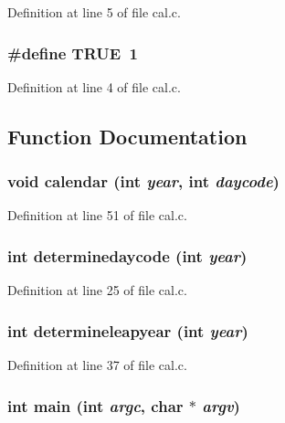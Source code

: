 Definition at line 5 of file cal.c.

\subsubsection[{TRUE}]{\setlength{\rightskip}{0pt plus 5cm}\#define TRUE~1}\label{cal_8c_aa8cecfc5c5c054d2875c03e77b7be15d}


Definition at line 4 of file cal.c.



\subsection{Function Documentation}
\subsubsection[{calendar}]{\setlength{\rightskip}{0pt plus 5cm}void calendar (int {\em year}, \/  int {\em daycode})}\label{cal_8c_a97ea32ae9f49a94f9a633020a924341c}


Definition at line 51 of file cal.c.

\subsubsection[{determinedaycode}]{\setlength{\rightskip}{0pt plus 5cm}int determinedaycode (int {\em year})}\label{cal_8c_a6b76896879d11c767b0cfca628c4591c}


Definition at line 25 of file cal.c.

\subsubsection[{determineleapyear}]{\setlength{\rightskip}{0pt plus 5cm}int determineleapyear (int {\em year})}\label{cal_8c_a576624b07ee30f4b1863380f5372f622}


Definition at line 37 of file cal.c.

\subsubsection[{main}]{\setlength{\rightskip}{0pt plus 5cm}int main (int {\em argc}, \/  char $\ast$ {\em argv})}\label{cal_8c_acb1b98fe4b4002de5d1321df345bb172}


